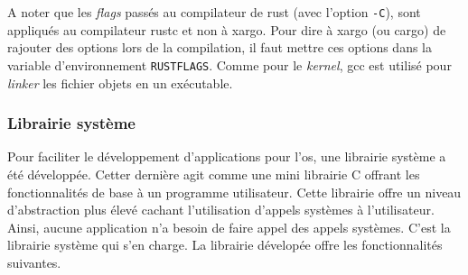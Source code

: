 A noter que les \textit{flags} passés au compilateur de rust (avec l'option
\texttt{-C}), sont appliqués au compilateur rustc et non à xargo. Pour
dire à xargo (ou cargo) de rajouter des options lors de la compilation, il faut
mettre ces options dans la variable d'environnement \texttt{RUSTFLAGS}.
Comme pour le \textit{kernel}, \acrshort{gcc} est utilisé pour \textit{linker}
les fichier objets en un exécutable.

\subsubsection{Librairie système}
Pour faciliter le développement d'applications pour l'\acrshort{os}, une librairie
système a été développée. Cetter dernière agit comme une mini librairie C offrant
les fonctionnalités de base à un programme utilisateur. Cette librairie offre
un niveau d'abstraction plus élevé cachant l'utilisation d'appels systèmes
à l'utilisateur. Ainsi, aucune application n'a besoin de faire appel des appels
systèmes. C'est la librairie système qui s'en charge. La librairie dévelopée
offre les fonctionnalités suivantes.


